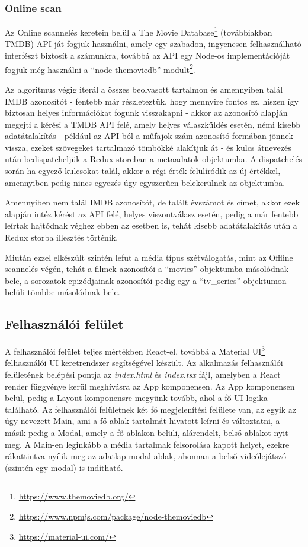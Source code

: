 \subsubsection{Online scan}
Az Online scannelés keretein belül a The Movie Database\footnote{\url{https://www.themoviedb.org/}} (továbbiakban TMDB) API-ját fogjuk használni, amely egy szabadon, ingyenesen felhasználható interfészt biztosít a számunkra, továbbá az API egy Node-os implementációját fogjuk még használni a ``node-themoviedb'' modult\footnote{\url{https://www.npmjs.com/package/node-themoviedb}}.

Az algoritmus végig iterál a összes beolvasott tartalmon és amennyiben talál IMDB azonosítót - fentebb már részleteztük, hogy mennyire fontos ez, hiszen így biztosan helyes információkat fogunk visszakapni - akkor az azonosító alapján megejti a kérési a TMDB API felé, amely helyes válaszküldés esetén, némi kisebb adatátalakítás - például az API-ból a műfajok szám azonosító formában jönnek vissza, ezeket szövegeket tartalmazó tömbökké alakítjuk át - és kulcs átnevezés után bedispatcheljük a Redux storeban a metaadatok objektumba. A dispatchelés során ha egyező kulcsokat talál, akkor a régi érték felülíródik az új értékkel, amennyiben pedig nincs egyezés úgy egyszerűen belekerülnek az objektumba.

Amennyiben nem talál IMDB azonosítót, de talált évszámot és címet, akkor ezek alapján intéz kérést az API felé, helyes viszontválasz esetén, pedig a már fentebb leírtak hajtódnak véghez ebben az esetben is, tehát kisebb adatátalakítás után a Redux storba illesztés történik.

Miután ezzel elkészült szintén lefut a média típus szétválogatás, mint az Offline scannelés végén, tehát a filmek azonosítói a ``movies'' objektumba másolódnak bele, a sorozatok epizódjainak azonosítói pedig egy a ``tv\_series'' objektumon belüli tömbbe másolódnak bele.

\subsection{Felhasználói felület}
A felhasználói felület teljes mértékben React-el, továbbá a Material UI\footnote{\url{https://material-ui.com/}} felhasználói UI keretrendszer segítségével készült. Az alkalmazás felhasználói felületének belépési pontja az {\it index.html} és {\it index.tsx} fájl, amelyben a React render függvénye kerül meghívásra az App komponensen. Az App komponensen belül, pedig a Layout komponensre megyünk tovább, ahol a fő UI logika található.
Az felhasználói felületnek két fő megjelenítési felülete van, az egyik az úgy nevezett Main, ami a fő ablak tartalmát hivatott leírni és változtatni, a másik pedig a Modal, amely a fő ablakon belüli, alárendelt, belső ablakot nyit meg.
A Main-en leginkább a média tartalmak felsorolása kapott helyet, ezekre rákattintva nyílik meg az adatlap modal ablak, ahonnan a belső videólejátszó (szintén egy modal) is indítható.

